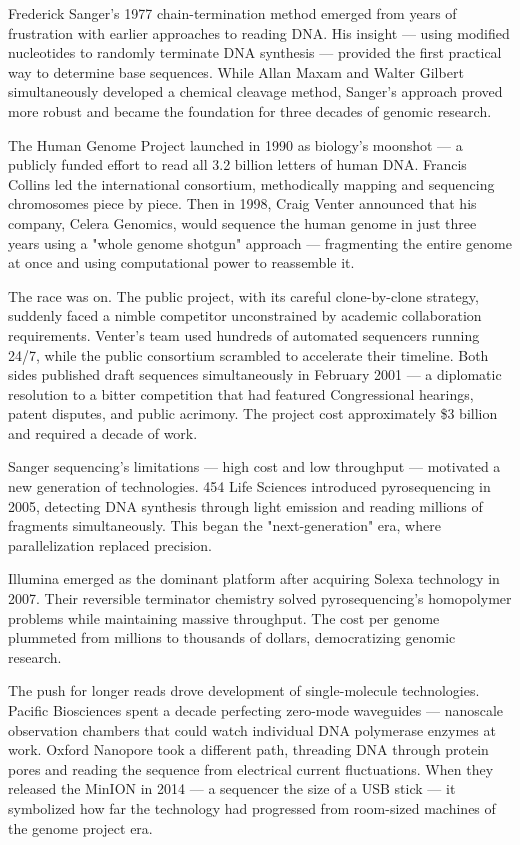 \begin{historical}
Frederick Sanger's 1977 chain-termination method emerged from years of frustration with earlier approaches to reading DNA. His insight — using modified nucleotides to randomly terminate DNA synthesis — provided the first practical way to determine base sequences. While Allan Maxam and Walter Gilbert simultaneously developed a chemical cleavage method, Sanger's approach proved more robust and became the foundation for three decades of genomic research.

The Human Genome Project launched in 1990 as biology's moonshot — a publicly funded effort to read all 3.2 billion letters of human DNA. Francis Collins led the international consortium, methodically mapping and sequencing chromosomes piece by piece. Then in 1998, Craig Venter announced that his company, Celera Genomics, would sequence the human genome in just three years using a "whole genome shotgun" approach — fragmenting the entire genome at once and using computational power to reassemble it.

The race was on. The public project, with its careful clone-by-clone strategy, suddenly faced a nimble competitor unconstrained by academic collaboration requirements. Venter's team used hundreds of automated sequencers running 24/7, while the public consortium scrambled to accelerate their timeline. Both sides published draft sequences simultaneously in February 2001 — a diplomatic resolution to a bitter competition that had featured Congressional hearings, patent disputes, and public acrimony. The project cost approximately \$3 billion and required a decade of work.

Sanger sequencing's limitations — high cost and low throughput — motivated a new generation of technologies. 454 Life Sciences introduced pyrosequencing in 2005, detecting DNA synthesis through light emission and reading millions of fragments simultaneously. This began the "next-generation" era, where parallelization replaced precision.

Illumina emerged as the dominant platform after acquiring Solexa technology in 2007. Their reversible terminator chemistry solved pyrosequencing's homopolymer problems while maintaining massive throughput. The cost per genome plummeted from millions to thousands of dollars, democratizing genomic research.

The push for longer reads drove development of single-molecule technologies. Pacific Biosciences spent a decade perfecting zero-mode waveguides — nanoscale observation chambers that could watch individual DNA polymerase enzymes at work. Oxford Nanopore took a different path, threading DNA through protein pores and reading the sequence from electrical current fluctuations. When they released the MinION in 2014 — a sequencer the size of a USB stick — it symbolized how far the technology had progressed from room-sized machines of the genome project era.


\end{historical}
